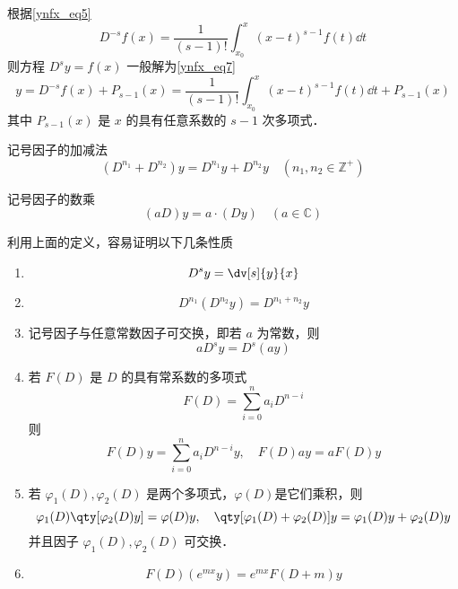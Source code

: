 根据\autoref{ynfx_eq5}~
\begin{equation}\label{Sign_eq9}
D^{-s}f(x)=\frac{1}{(s-1)!}\int_{x_0}^x(x-t)^{s-1}f(t)\dd t
\end{equation}
则方程 $D^sy=f(x)$ 一般解为\autoref{ynfx_eq7}~
\begin{equation}
y=D^{-s}f(x)+P_{s-1}(x)=\frac{1}{(s-1)!}\int_{x_0}^x(x-t)^{s-1}f(t)\dd t+P_{s-1}(x)
\end{equation}
其中 $P_{s-1}(x)$ 是 $x$ 的具有任意系数的 $s-1$ 次多项式．
\begin{definition}{记号因子的加减法}
\begin{equation}
(D^{n_1}+D^{n_2})y=D^{n_1}y+D^{n_2}y\quad(n_1,n_2\in \mathbb{Z^{+
}})
\end{equation}
\end{definition}
\begin{definition}{记号因子的数乘}
\begin{equation}
(aD)y=a\cdot(Dy)\quad(a\in\mathbb{C})
\end{equation}
\end{definition}
利用上面的定义，容易证明以下几条性质
\begin{enumerate}
\item 
\begin{equation}
D^sy=\dv[s]{y}{x}
\end{equation}
\item 
\begin{equation}
D^{n_1}(D^{n_2}y)=D^{n_1+n_2}y
\end{equation}
\item 记号因子与任意常数因子可交换，即若 $a$ 为常数，则
\begin{equation}
aD^sy=D^s(ay)
\end{equation}
\item 若 $F(D)$ 是 $D$ 的具有常系数的多项式
\begin{equation}
F(D)=\sum_{i=0}^{n}a_iD^{n-i}
\end{equation}
则
\begin{equation}
F(D)y=\sum_{i=0}^{n}a_iD^{n-i}y,\quad F(D)ay=aF(D)y
\end{equation}
\item 若 $\varphi_1(D),\varphi_2(D)$ 是两个多项式，$\varphi(D)$是它们乘积，则
\begin{equation}
\varphi_1(D)\qty[\varphi_2(D)y]=\varphi(D)y,\quad \qty[\varphi_1(D)+\varphi_2(D)]y=\varphi_1(D)y+\varphi_2(D)y
\end{equation}
并且因子 $\varphi_1(D),\varphi_2(D)$ 可交换．
\item \begin{equation}\label{Sign_eq1}
F(D)(e^{mx}y)=e^{mx}F(D+m)y
\end{equation}
\end{enumerate}

